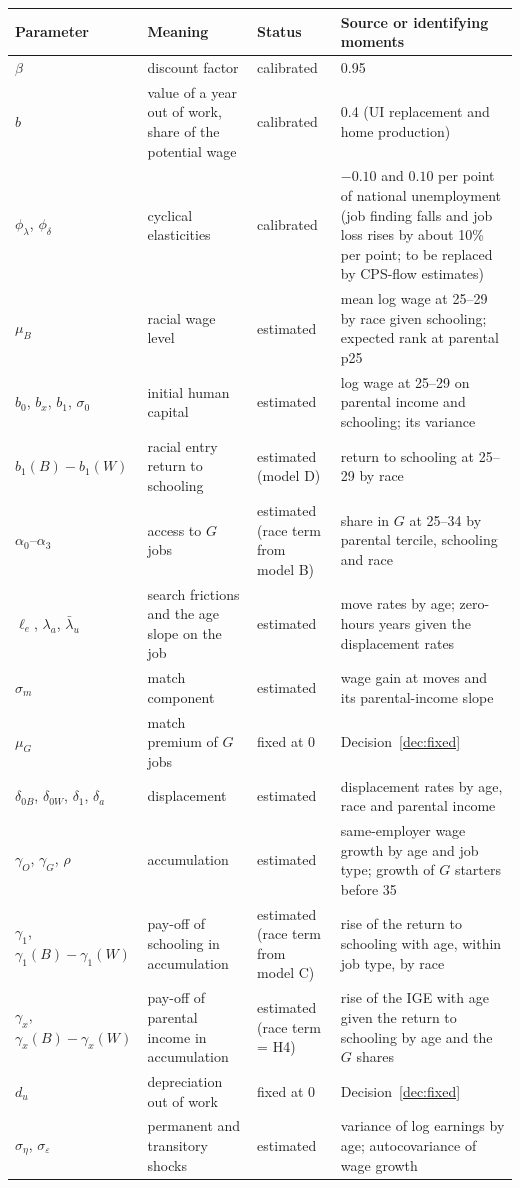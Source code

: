 \documentclass[11pt]{article}
\newcommand{\1}{\mathbf{1}}
\begin{document}
\begin{longtable}{L{2.8cm}L{5.4cm}L{2.2cm}L{4.6cm}}
\toprule
Parameter & Meaning & Status & Source or identifying moments \\
\midrule
\endhead
$\beta$ & discount factor & calibrated & 0.95 \\
$b$ & value of a year out of work, share of the potential wage & calibrated & 0.4 (UI replacement and home production) \\
$\phi_\lambda$, $\phi_\delta$ & cyclical elasticities & calibrated & $-0.10$ and $0.10$ per point of national
unemployment (job finding falls and job loss rises by about 10\% per point; to be replaced by CPS-flow estimates) \\
\midrule
$\mu_B$ & racial wage level & estimated & mean log wage at 25--29 by race given schooling; expected rank at parental p25 \\
$b_0$, $b_x$, $b_1$, $\sigma_0$ & initial human capital & estimated & log wage at 25--29 on parental income and schooling; its variance \\
$b_1(B) - b_1(W)$ & racial entry return to schooling & estimated (model D) & return to schooling at 25--29 by race \\
$\alpha_0$--$\alpha_3$ & access to $G$ jobs & estimated (race term from model B) & share in $G$ at 25--34 by parental tercile, schooling and race \\
$\ell_e$, $\lambda_a$, $\bar\lambda_u$ & search frictions and the age slope on the job & estimated & move rates by
age; zero-hours years given the displacement rates \\
$\sigma_m$ & match component & estimated & wage gain at moves and its parental-income slope \\
$\mu_G$ & match premium of $G$ jobs & fixed at 0 & Decision~\ref{dec:fixed} \\
$\delta_{0B}$, $\delta_{0W}$, $\delta_1$, $\delta_a$ & displacement & estimated & displacement rates by age, race and parental income \\
$\gamma_O$, $\gamma_G$, $\rho$ & accumulation & estimated & same-employer wage growth by age and job type; growth of $G$ starters before 35 \\
$\gamma_1$, $\gamma_1(B) - \gamma_1(W)$ & pay-off of schooling in accumulation & estimated (race term from model C) & rise of the return to schooling with age, within job type, by race \\
$\gamma_x$, $\gamma_x(B) - \gamma_x(W)$ & pay-off of parental income in accumulation & estimated (race term = H4) & rise of the IGE with age given the return to schooling by age and the $G$ shares \\
$d_u$ & depreciation out of work & fixed at 0 & Decision~\ref{dec:fixed} \\
$\sigma_\eta$, $\sigma_\varepsilon$ & permanent and transitory shocks & estimated & variance of log earnings by age; autocovariance of wage growth \\
\bottomrule
\end{longtable}
\end{document}
